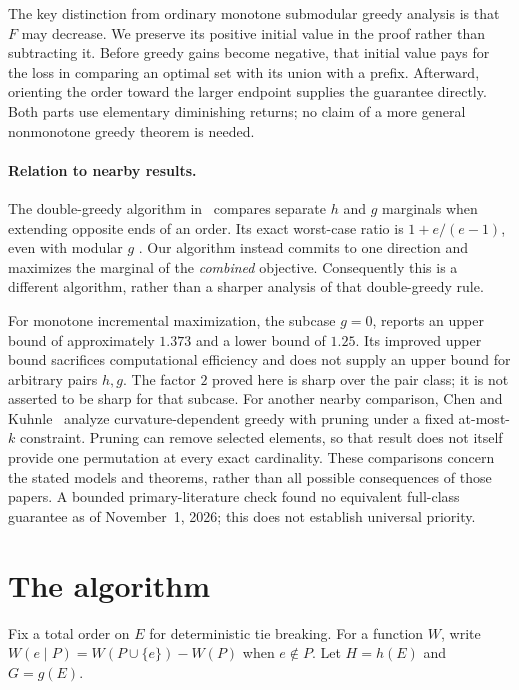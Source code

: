 \documentclass[acmsmall,screen,nonacm,11pt,natbib=false]{acmart}
\begin{document}
The key distinction from ordinary monotone submodular greedy analysis is
that $F$ may decrease. We preserve its positive initial value in the proof
rather than subtracting it. Before greedy gains become negative, that initial
value pays for the loss in comparing an optimal set with its union with a
prefix. Afterward, orienting the order toward the larger endpoint supplies
the guarantee directly. Both parts use elementary diminishing returns; no
claim of a more general nonmonotone greedy theorem is needed.

\paragraph{Relation to nearby results.}
The double-greedy algorithm in~\cite{DKLS26} compares separate $h$ and $g$
marginals when extending opposite ends of an order. Its exact worst-case
ratio is $1+e/(e-1)$, even with modular $g$
\cite[Proposition~19 and Corollary~20]{DKLS26}. Our algorithm instead commits
to one direction and maximizes the marginal of the \emph{combined} objective.
Consequently this is a different algorithm, rather than a sharper analysis
of that double-greedy rule.

For monotone incremental maximization, the subcase $g=0$,
\cite{BBBCDL26} reports an upper bound of approximately $1.373$ and a lower bound of $1.25$.
Its improved upper bound sacrifices computational efficiency and does not
supply an upper bound for arbitrary pairs $h,g$. The factor $2$ proved here
is sharp over the pair class; it is not asserted to be sharp for that subcase.
For another nearby comparison, Chen and Kuhnle~\cite{CK26} analyze
curvature-dependent greedy with pruning under a fixed at-most-$k$ constraint.
Pruning can remove selected elements, so that result does not itself provide
one permutation at every exact cardinality. These comparisons concern the
stated models and theorems, rather than all possible consequences of those
papers. A bounded primary-literature check found no equivalent full-class
guarantee as of November~1, 2026; this does not establish universal priority.

\section{The algorithm}\label{sec:algorithm}

Fix a total order on $E$ for deterministic tie breaking. For a function $W$,
write $W(e\mid P)=W(P\cup\{e\})-W(P)$ when $e\notin P$.
Let $H=h(E)$ and $G=g(E)$.
\end{document}
